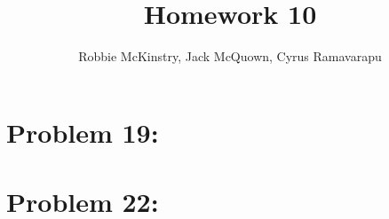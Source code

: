 \documentclass[12pt]{article}
\begin{document}
\title{Homework 10}
\author{Robbie McKinstry, Jack McQuown, Cyrus Ramavarapu}
\renewcommand{\today}{26 September 2016}
\renewcommand{\baselinestretch}{1.5}
\maketitle

\section*{Problem 19: }
\section*{Problem 22: }
\end{document}
